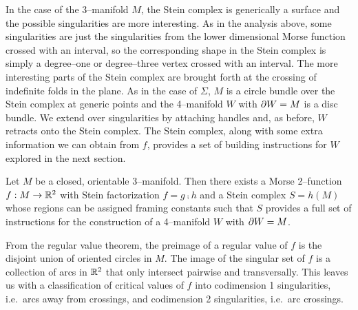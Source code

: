 In the case of the 3--manifold $M$, the Stein complex is generically a surface and the possible singularities are more interesting.
As in the analysis above, some singularities are just the singularities from the lower dimensional Morse function crossed with an interval, so the corresponding shape in the Stein complex is simply a degree--one or degree--three vertex crossed with an interval.
The more interesting parts of the Stein complex are brought forth at the crossing of indefinite folds in the plane.
As in the case of $\Sigma$, $M$ is a circle bundle over the Stein complex at generic points and the 4--manifold $W$ with $\partial W = M$ is a disc bundle.
We extend over singularities by attaching handles and, as before, $W$ retracts onto the Stein complex.
The Stein complex, along with some extra information we can obtain from $f$, provides a set of building instructions for $W$ explored in the next section.


\begin{cor}
	Let $M$ be a closed, orientable 3--manifold.
	Then there exists a Morse 2--function $f:M\to\mathbb{R}^2$ with Stein factorization $f=g\comp h$ and a Stein complex $S=h(M)$ whose regions can be assigned framing constants such that $S$ provides a full set of instructions for the construction of a 4--manifold $W$ with $\partial W=M$.
\end{cor}






From the regular value theorem, the preimage of a regular value of $f$ is the disjoint union of oriented circles in $M$.
The image of the singular set of $f$ is a collection of arcs in $\mathbb{R}^2$ that only intersect pairwise and transversally.
This leaves us with a classification of critical values of $f$ into codimension 1 singularities, i.e.\ arcs away from crossings, and codimension 2 singularities, i.e.\ arc crossings.
